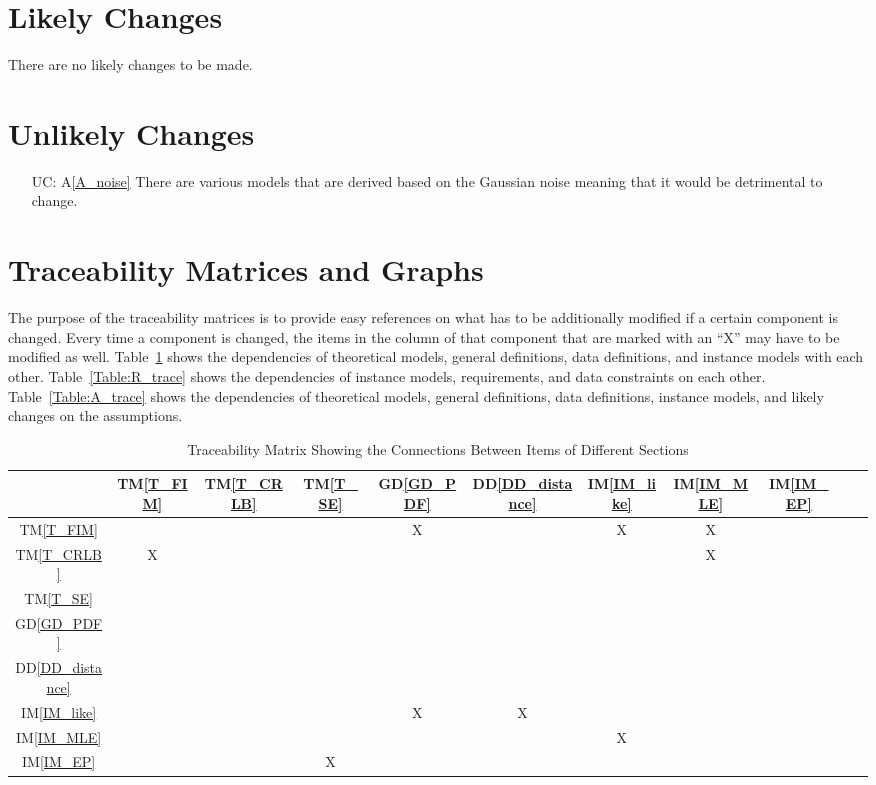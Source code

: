 \documentclass[12pt]{article}
\newcommand{\dref}[1]{GD\ref{#1}}
\newcommand{\ddref}[1]{DD\ref{#1}}
\newcommand{\tref}[1]{TM\ref{#1}}
\newcommand{\aref}[1]{A\ref{#1}}
\newcommand{\iref}[1]{IM\ref{#1}}
\newcounter{ucnum} %
\begin{document}
\section{Likely Changes}    

There are no likely changes to be made.

\section{Unlikely Changes}    

\noindent \begin{itemize}

\item[UC\refstepcounter{ucnum}\theucnum\label{UC_noise}:] \aref{A_noise} There are various models that are derived based on the Gaussian noise meaning that it would be detrimental to change.

\end{itemize}

\section{Traceability Matrices and Graphs}

The purpose of the traceability matrices is to provide easy references on what
has to be additionally modified if a certain component is changed.  Every time a
component is changed, the items in the column of that component that are marked
with an ``X'' may have to be modified as well.  Table~\ref{Table:trace} shows the
dependencies of theoretical models, general definitions, data definitions, and
instance models with each other. Table~\ref{Table:R_trace} shows the
dependencies of instance models, requirements, and data constraints on each
other. Table~\ref{Table:A_trace} shows the dependencies of theoretical models,
general definitions, data definitions, instance models, and likely changes on
the assumptions.

\begin{table}[h!]
\centering
\begin{tabular}{|c|c|c|c|c|c|c|c|c|c|c|}
\hline        
	& \tref{T_FIM}& \tref{T_CRLB}& \tref{T_SE} & \dref{GD_PDF}& \ddref{DD_distance} & \iref{IM_like} & \iref{IM_MLE} & \iref{IM_EP}\\
\hline
\tref{T_FIM}          & & & & X& &X &X & \\ \hline
\tref{T_CRLB}         & X& & & & & & X & \\ \hline
\tref{T_SE}           & & & & & & &  &\\ \hline
\dref{GD_PDF}         & & & & & & &  &\\ \hline
\ddref{DD_distance}   & & & & & & &  &\\ \hline
\iref{IM_like}        & & & &X &X & &  &\\ \hline
\iref{IM_MLE}         & & & & & &X & &\\ \hline
\iref{IM_EP}         & & &X & & & & &\\
\hline
\end{tabular}
\caption{Traceability Matrix Showing the Connections Between Items of Different Sections}
\label{Table:trace}
\end{table}
\end{document}
